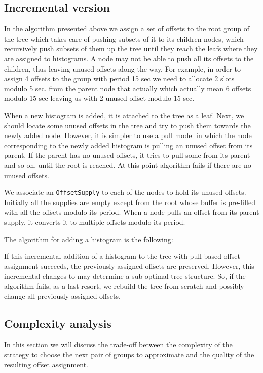 \subsection*{Incremental version}

In the algorithm presented above we assign a set of offsets to the root group of the tree which takes care of pushing subsets of it to its children nodes, which recursively push subsets of them up the tree until they reach the leafs where they are assigned to histograms. A node may not be able to push all its offsets to the children, thus leaving unused offsets along the way. For example, in order to assign 4 offsets to the group with period 15 sec we need to allocate 2 slots modulo 5 sec. from the parent node that actually which actually mean 6 offsets modulo 15 sec leaving us with 2 unused offset modulo 15 sec.

When a new histogram is added, it is attached to the tree as a leaf. Next, we should locate some unused offsets in the tree and try to push them towards the newly added node. However, it is simpler to use a pull model in which the node corresponding to the newly added histogram is pulling an unused offset from its parent. If the parent has no unused offsets, it tries to pull some from its parent and so on, until the root is reached. At this point algorithm fails if there are no unused offsets.

We associate an {\tt OffsetSupply} to each of the nodes to hold its unused offsets. Initially all the supplies are empty except from the root whose buffer is pre-filled with all the offsets modulo its period. When a node pulls an offset from its parent supply, it converts it to multiple offsets modulo its period.

The algorithm for adding a histogram is the following:

If this incremental addition of a histogram to the tree with pull-based offset assignment succeeds, the previously assigned offsets are preserved. However, this incremental changes to may determine a sub-optimal tree structure. So, if the algorithm fails, as a last resort, we rebuild the tree from scratch and possibly change all previously assigned offsets.

\subsection*{Complexity analysis}

In this section we will discuss the trade-off between the complexity of the strategy to choose the next pair of groups to approximate and the quality of the resulting offset assignment.

